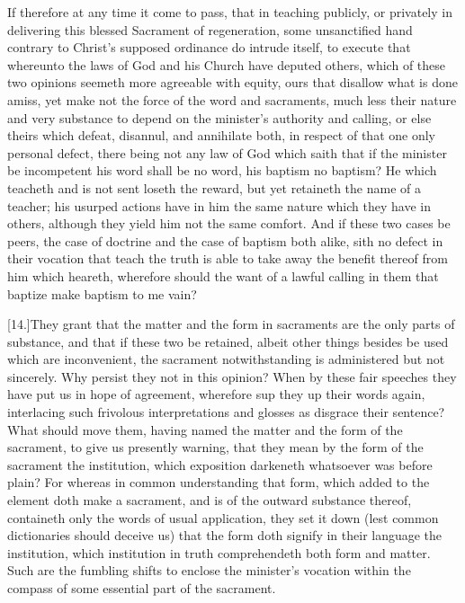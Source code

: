 If therefore at any time it come to pass, that in teaching publicly, or privately in delivering this blessed Sacrament of regeneration, some unsanctified hand contrary to Christ’s supposed ordinance do intrude itself, to execute that whereunto the laws of God and his Church have deputed others, which of these two opinions seemeth more agreeable with equity, ours that disallow what is done amiss, yet make not the force of the word and sacraments, much less their nature and very substance to depend on the minister’s authority and calling, or else theirs which defeat, disannul, and annihilate both, in respect of that one only personal defect, there being not any law of God which saith that if the minister be incompetent his word shall be no word, his baptism no baptism? He which teacheth and is not sent loseth the reward, but yet retaineth the name of a teacher; his usurped actions have in him the same nature which they have in others, although they yield him not the same comfort. And if these two cases be peers, the case of doctrine and the case of baptism both alike, sith no defect in their vocation that teach the truth is able to take away the benefit thereof from  him which heareth, wherefore should the want of a lawful calling in them that baptize make baptism to me vain?

[14.]They grant that the matter and the form in sacraments are the only parts of substance, and that if these two be retained, albeit other things besides be used which are inconvenient, the sacrament notwithstanding is administered but not sincerely. Why persist they not in this opinion? When by these fair speeches they have put us in hope of agreement, wherefore sup they up their words again, interlacing such frivolous interpretations and glosses as disgrace their sentence? What should move them, having named the matter and the form of the sacrament, to give us presently warning, that they mean by the form of the sacrament the institution, which exposition darkeneth whatsoever was before plain? For whereas in common understanding that form, which added to the element doth make a sacrament, and is of the outward substance thereof, containeth only the words of usual application, they set it down (lest common dictionaries should deceive us) that the form doth signify in their language the institution, which institution in truth comprehendeth both form and matter. Such are the fumbling shifts to enclose the minister’s vocation within the compass of some essential part of the sacrament.

